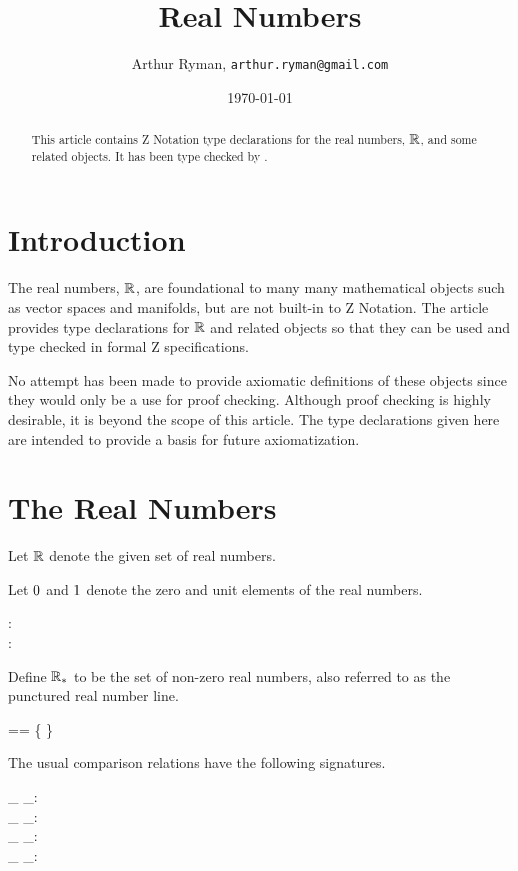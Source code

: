 \documentclass[11pt, oneside]{article}
\title{Real Numbers}
\author{Arthur Ryman, {\tt arthur.ryman@gmail.com}}
\date{\today}
\begin{document}
\maketitle

\begin{abstract}
This article contains Z Notation type declarations for the real numbers, $\mathbb{R}$, and some related objects.
It has been type checked by \fuzz.
\end{abstract}

\section{Introduction}

The real numbers, $\mathbb{R}$, are foundational to many many mathematical objects such as vector spaces and manifolds,
but are not built-in to Z Notation.
The article provides type declarations for $\mathbb{R}$ and related objects so that they can be used and type checked in formal Z specifications.

No attempt has been made to provide axiomatic definitions of these objects since they would only be a use for proof checking.
Although proof checking is highly desirable, it is beyond the scope of this article.
The type declarations given here are intended to provide a basis for future axiomatization.

\section{The Real Numbers}

Let $\mathbb{R}$ denote the given set of real numbers.
\begin{zed}
	[\R]
\end{zed}

Let $0$ and $1$ denote the zero and unit elements of the real numbers.
\begin{axdef}
	\zeroR: \R \\
	\oneR: \R
\end{axdef}

Define $\mathbb{R}_{*}$ to be the set of non-zero real numbers, 
also referred to as the punctured real number line.
\begin{zed}
	\Rnz == \R \setminus \{ \zeroR \}
\end{zed}

The usual comparison relations have the following signatures.
\begin{axdef}
	\_ \ltR \_: \R \rel \R \\
	\_ \leR \_: \R \rel \R \\
	\_ \gtR \_: \R \rel \R \\
	\_ \geR \_: \R \rel \R
\end{axdef}
\end{document}
